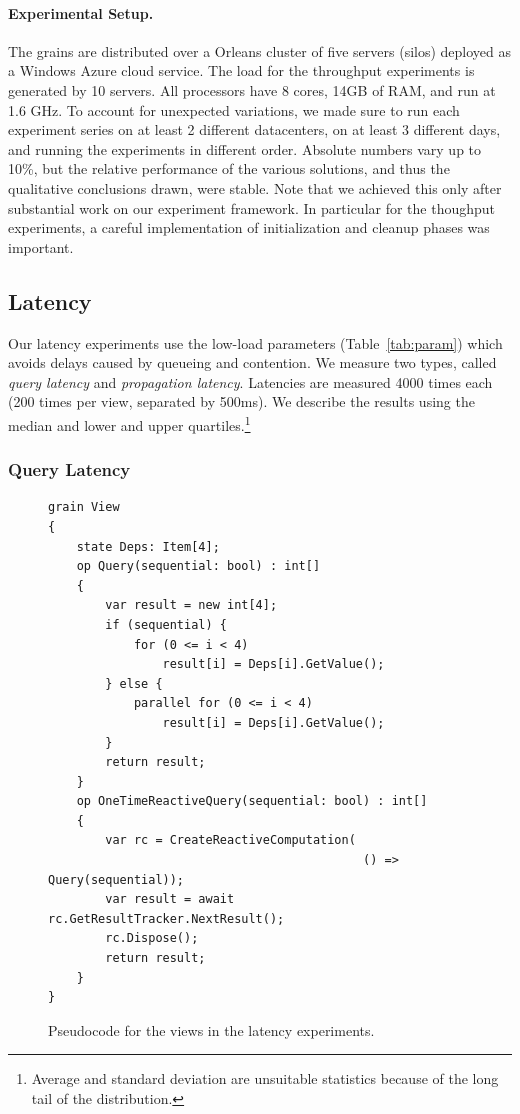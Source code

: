 \paragraph{Experimental Setup.} The grains are distributed over a Orleans cluster of five servers (silos) deployed as a Windows Azure cloud service. The load for the throughput experiments is generated by 10 servers. All processors have 8 cores, 14GB of RAM, and run at 1.6 GHz. To account for unexpected variations, we made sure to run each experiment series on at least 2 different datacenters, on at least 3 different days, and running the experiments in different order. Absolute numbers vary up to 10\%, but the relative performance of the various solutions, and thus the qualitative conclusions drawn, were stable. Note that we achieved this only after substantial work on our experiment framework. In particular for the thoughput experiments, a careful implementation of initialization and cleanup phases was important.

\subsection{Latency}\label{sec:latency}

Our latency experiments use the low-load parameters (Table~\ref{tab:param}) which avoids delays caused by queueing and contention. We measure two types, called \emph{query latency} and \emph{propagation latency}. Latencies are measured 4000 times each (200 times per view, separated by 500ms). We describe the results using the median and lower and upper quartiles.\footnote{Average and standard deviation are unsuitable statistics because of the long tail of the distribution.}

\subsubsection{Query Latency}


\begin{figure}
\begin{lstlisting}
grain View
{
	state Deps: Item[4]; 
	op Query(sequential: bool) : int[]
	{	
		var result = new int[4];
		if (sequential) {
			for (0 <= i < 4)
				result[i] = Deps[i].GetValue();
		} else {
			parallel for (0 <= i < 4)
				result[i] = Deps[i].GetValue();
		}
		return result;
	}
	op OneTimeReactiveQuery(sequential: bool) : int[]
	{
	 	var rc = CreateReactiveComputation(
	 										() => Query(sequential));
		var result = await rc.GetResultTracker.NextResult();
		rc.Dispose();
		return result;
	}
}
\end{lstlisting}
\caption{Pseudocode for the views in the latency experiments.}\label{fig:queries}
\end{figure}

